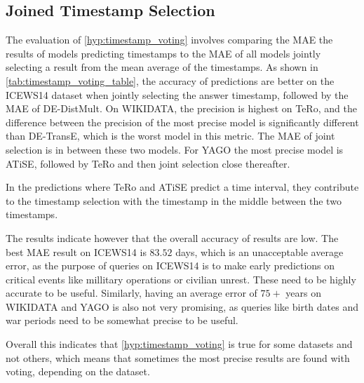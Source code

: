 \subsection{Joined Timestamp Selection}
\label{seubsec:timestamp_voting_experiment}



The evaluation of \autoref{hyp:timestamp_voting} involves comparing the MAE the results of models predicting timestamps to the MAE of all models jointly selecting a result from the mean average of the timestamps. As shown in \autoref{tab:timestamp_voting_table}, the accuracy of predictions are better on the ICEWS14 dataset when jointly selecting the answer timestamp, followed by the MAE of DE-DistMult. On WIKIDATA, the precision is highest on TeRo, and the difference between the precision of the most precise model is significantly different than DE-TransE, which is the worst model in this metric. The MAE of joint selection is in between these two models. For YAGO the most precise model is ATiSE, followed by TeRo and then joint selection close thereafter.

In the predictions where TeRo and ATiSE predict a time interval, they contribute to the timestamp selection with the timestamp in the middle between the two timestamps.

The results indicate however that the overall accuracy of results are low. The best MAE result on ICEWS14 is $83.52$ days, which is an unacceptable average error, as the purpose of queries on ICEWS14 is to make early predictions on critical events like millitary operations or civilian unrest. These need to be highly accurate to be useful. Similarly, having an average error of $75+$ years on WIKIDATA and YAGO is also not very promising, as queries like birth dates and war periods need to be somewhat precise to be useful.

Overall this indicates that \autoref{hyp:timestamp_voting} is true for some datasets and not others, which means that sometimes the most precise results are found with voting, depending on the dataset.

